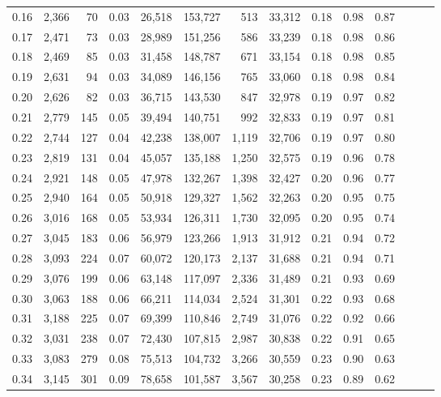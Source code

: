 \begin{tabular}{rrrrrrrrrrrrrr}
0.16 &  2,366 &   70 &  0.03 &   26,518 &  153,727 &     513 &  33,312 &  0.18 &  0.98 &      0.87 \\
0.17 &  2,471 &   73 &  0.03 &   28,989 &  151,256 &     586 &  33,239 &  0.18 &  0.98 &      0.86 \\
0.18 &  2,469 &   85 &  0.03 &   31,458 &  148,787 &     671 &  33,154 &  0.18 &  0.98 &      0.85 \\
0.19 &  2,631 &   94 &  0.03 &   34,089 &  146,156 &     765 &  33,060 &  0.18 &  0.98 &      0.84 \\
0.20 &  2,626 &   82 &  0.03 &   36,715 &  143,530 &     847 &  32,978 &  0.19 &  0.97 &      0.82 \\
0.21 &  2,779 &  145 &  0.05 &   39,494 &  140,751 &     992 &  32,833 &  0.19 &  0.97 &      0.81 \\
0.22 &  2,744 &  127 &  0.04 &   42,238 &  138,007 &   1,119 &  32,706 &  0.19 &  0.97 &      0.80 \\
0.23 &  2,819 &  131 &  0.04 &   45,057 &  135,188 &   1,250 &  32,575 &  0.19 &  0.96 &      0.78 \\
0.24 &  2,921 &  148 &  0.05 &   47,978 &  132,267 &   1,398 &  32,427 &  0.20 &  0.96 &      0.77 \\
0.25 &  2,940 &  164 &  0.05 &   50,918 &  129,327 &   1,562 &  32,263 &  0.20 &  0.95 &      0.75 \\
0.26 &  3,016 &  168 &  0.05 &   53,934 &  126,311 &   1,730 &  32,095 &  0.20 &  0.95 &      0.74 \\
0.27 &  3,045 &  183 &  0.06 &   56,979 &  123,266 &   1,913 &  31,912 &  0.21 &  0.94 &      0.72 \\
0.28 &  3,093 &  224 &  0.07 &   60,072 &  120,173 &   2,137 &  31,688 &  0.21 &  0.94 &      0.71 \\
0.29 &  3,076 &  199 &  0.06 &   63,148 &  117,097 &   2,336 &  31,489 &  0.21 &  0.93 &      0.69 \\
0.30 &  3,063 &  188 &  0.06 &   66,211 &  114,034 &   2,524 &  31,301 &  0.22 &  0.93 &      0.68 \\
0.31 &  3,188 &  225 &  0.07 &   69,399 &  110,846 &   2,749 &  31,076 &  0.22 &  0.92 &      0.66 \\
0.32 &  3,031 &  238 &  0.07 &   72,430 &  107,815 &   2,987 &  30,838 &  0.22 &  0.91 &      0.65 \\
0.33 &  3,083 &  279 &  0.08 &   75,513 &  104,732 &   3,266 &  30,559 &  0.23 &  0.90 &      0.63 \\
0.34 &  3,145 &  301 &  0.09 &   78,658 &  101,587 &   3,567 &  30,258 &  0.23 &  0.89 &      0.62 \\

\end{tabular}
